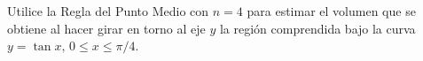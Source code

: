\item Utilice la Regla del Punto Medio con $n = 4$ para estimar el volumen que se obtiene al hacer girar en torno al eje $y$ la región comprendida bajo la curva $y = \tan x, \, 0 \le x \le \pi/4$.
